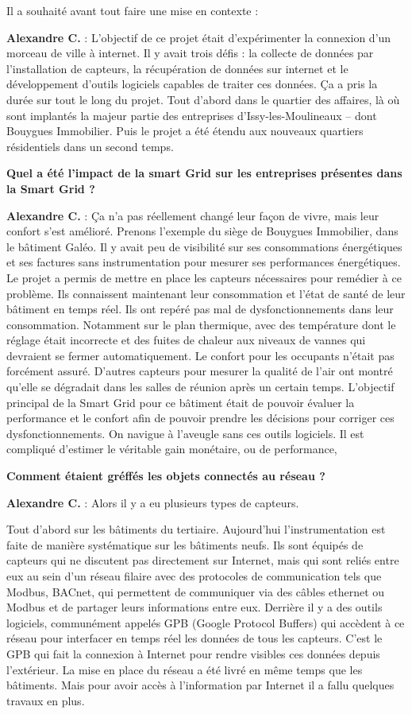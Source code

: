 Il a souhaité avant tout faire une mise en contexte :

\textbf{Alexandre C.} :
L'objectif de ce projet était d’expérimenter la connexion d’un morceau de ville à internet.
Il y avait trois défis : la collecte de données par l’installation de capteurs,
la récupération de données sur internet et le développement d’outils logiciels capables de traiter ces données.
Ça a pris la durée sur tout le long du projet. Tout d’abord dans le quartier des affaires,
là où sont implantés la majeur partie des entreprises d'Issy-les-Moulineaux – dont Bouygues Immobilier.
Puis le projet a été étendu aux nouveaux quartiers résidentiels dans un second temps.

\textbf{Quel a été l’impact de la smart Grid sur les entreprises présentes dans la Smart Grid ?}

\textbf{Alexandre C.} :
Ça n’a pas réellement changé leur façon de vivre, mais leur confort s'est amélioré.
Prenons l'exemple du siège de Bouygues Immobilier, dans le bâtiment Galéo.
Il y avait peu de visibilité sur ses consommations énergétiques
et ses factures sans instrumentation pour mesurer ses performances énergétiques.
Le projet a permis de mettre en place les capteurs nécessaires pour remédier à ce problème.
Ils connaissent maintenant leur consommation et l’état de santé de leur bâtiment en temps réel.
Ils ont repéré pas mal de dysfonctionnements dans leur consommation.
Notamment sur le plan thermique, avec des température dont le réglage était incorrecte
et des fuites de chaleur aux niveaux de vannes qui devraient se fermer automatiquement.
Le confort pour les occupants n’était pas forcément assuré.
D'autres capteurs pour mesurer la qualité de l’air ont montré qu'elle se dégradait dans les salles de réunion après un certain temps.
L’objectif principal de la Smart Grid pour ce bâtiment était de pouvoir évaluer la performance
et le confort afin de pouvoir prendre les décisions pour corriger ces dysfonctionnements.
On navigue à l’aveugle sans ces outils logiciels.
Il est compliqué d’estimer le véritable gain monétaire, ou de performance,

\textbf{Comment étaient gréffés les objets connectés au réseau ?}

\textbf{Alexandre C.} :
Alors il y a eu plusieurs types de capteurs.

Tout d’abord sur les bâtiments du tertiaire.
Aujourd’hui l’instrumentation est faite de manière systématique sur les bâtiments neufs.
Ils sont équipés de capteurs qui ne discutent pas directement sur Internet,
mais qui sont reliés entre eux au sein d’un réseau filaire avec des protocoles de communication
tels que Modbus, BACnet, qui permettent de communiquer via des câbles ethernet ou Modbus
et de partager leurs informations entre eux.
Derrière il y a des outils logiciels, communément appelés GPB (Google Protocol Buffers) qui accèdent à ce réseau
pour interfacer en temps réel les données de tous les capteurs.
C'est le GPB qui fait la connexion à Internet pour rendre visibles ces données depuis l'extérieur.
La mise en place du réseau a été livré en même temps que les bâtiments.
Mais pour avoir accès à l’information par Internet il a fallu quelques travaux en plus.

